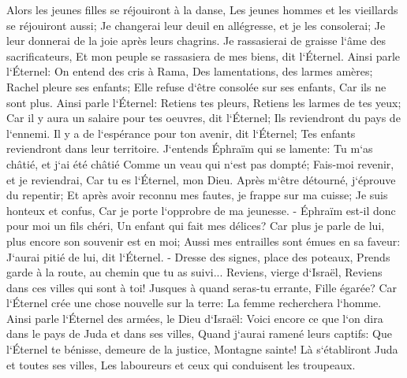 \verse Alors les jeunes filles se réjouiront à la danse, Les jeunes hommes et les vieillards se réjouiront aussi; Je changerai leur deuil en allégresse, et je les consolerai; Je leur donnerai de la joie après leurs chagrins. 
\verse Je rassasierai de graisse l`âme des sacrificateurs, Et mon peuple se rassasiera de mes biens, dit l`Éternel. 
\verse Ainsi parle l`Éternel: On entend des cris à Rama, Des lamentations, des larmes amères; Rachel pleure ses enfants; Elle refuse d`être consolée sur ses enfants, Car ils ne sont plus. 
\verse Ainsi parle l`Éternel: Retiens tes pleurs, Retiens les larmes de tes yeux; Car il y aura un salaire pour tes oeuvres, dit l`Éternel; Ils reviendront du pays de l`ennemi. 
\verse Il y a de l`espérance pour ton avenir, dit l`Éternel; Tes enfants reviendront dans leur territoire. 
\verse J`entends Éphraïm qui se lamente: Tu m`as châtié, et j`ai été châtié Comme un veau qui n`est pas dompté; Fais-moi revenir, et je reviendrai, Car tu es l`Éternel, mon Dieu. 
\verse Après m`être détourné, j`éprouve du repentir; Et après avoir reconnu mes fautes, je frappe sur ma cuisse; Je suis honteux et confus, Car je porte l`opprobre de ma jeunesse. - 
\verse Éphraïm est-il donc pour moi un fils chéri, Un enfant qui fait mes délices? Car plus je parle de lui, plus encore son souvenir est en moi; Aussi mes entrailles sont émues en sa faveur: J`aurai pitié de lui, dit l`Éternel. - 
\verse Dresse des signes, place des poteaux, Prends garde à la route, au chemin que tu as suivi... Reviens, vierge d`Israël, Reviens dans ces villes qui sont à toi! 
\verse Jusques à quand seras-tu errante, Fille égarée? Car l`Éternel crée une chose nouvelle sur la terre: La femme recherchera l`homme. 
\verse Ainsi parle l`Éternel des armées, le Dieu d`Israël: Voici encore ce que l`on dira dans le pays de Juda et dans ses villes, Quand j`aurai ramené leurs captifs: Que l`Éternel te bénisse, demeure de la justice, Montagne sainte! 
\verse Là s`établiront Juda et toutes ses villes, Les laboureurs et ceux qui conduisent les troupeaux. 
